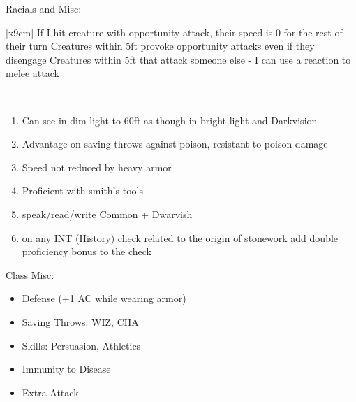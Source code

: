 \documentclass[12pt, xcolor={dvipsnames}]{beamer}
\newcommand{\tn}{\tabularnewline\hline}
\newcommand{\wiz}{{\color{red}WIZ}}
\newcommand{\inte}{{\color{red}INT}}
\newcommand{\cha}{{\color{red}CHA}}
\begin{document}
\begin{frame}
  \tiny
  Racials and Misc:\\ \vspace{1em}

  \begin{tabular}{|x{9cm}|} \hline
    \tn
    If I hit creature with opportunity attack, their speed is 0 for the rest of their turn\tn
    Creatures within 5ft provoke opportunity attacks even if they disengage\tn
    Creatures within 5ft that attack someone else - I can use a reaction to melee attack\tn
  \end{tabular}\\ \vspace{1em}

  \begin{enumerate}
  \small

  \item Can see in dim light to 60ft as though in bright light
    and {\color{DarkOrchid}Darkvision}

  \item Advantage on saving throws against poison, resistant to poison damage

  \item Speed not reduced by heavy armor

  \item Proficient with smith's tools

  \item speak/read/write Common + Dwarvish

  \item on any {\inte} (History) check related to the origin of stonework
    add double proficiency bonus to the check
\end{enumerate}
\end{frame}

\begin{frame}
  Class Misc:
  \begin{itemize}
    \item Defense (+1 AC while wearing armor)

    \item Saving Throws:  {\wiz}, {\cha}

    \item Skills: Persuasion, Athletics

    \item Immunity to Disease

    \item Extra Attack
  \end{itemize}
\end{frame}
\end{document}
